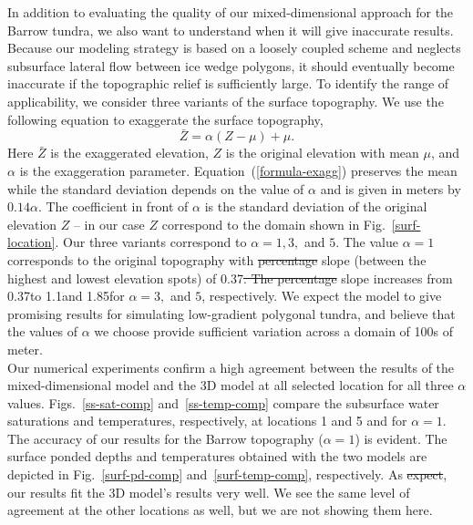 \documentclass[review,11pt]{elsarticle}
\providecommand{\DIFadd}[1]{{\protect\color{blue}\uwave{#1}}} %
\providecommand{\DIFdel}[1]{{\protect\color{red}\sout{#1}}}                      %
\providecommand{\DIFaddbegin}{} %
\providecommand{\DIFaddend}{} %
\providecommand{\DIFdelbegin}{} %
\providecommand{\DIFdelend}{} %
\begin{document}
In addition to evaluating the quality of our mixed-dimensional approach for the Barrow tundra, we also want to understand when it will give inaccurate results. Because our modeling strategy is based on a loosely coupled scheme and neglects subsurface lateral flow between ice wedge polygons, it should eventually become inaccurate if the topographic relief is sufficiently large. To identify the range of applicability, we consider three variants of the surface topography.  We use the following equation to exaggerate the surface topography,
\begin{equation}\label{formula-exagg}
\bar{Z} =  \alpha (Z - \mu) + \mu.
\end{equation}
Here $\bar{Z}$ is the exaggerated elevation, $Z$ is the original elevation with mean $\mu$, and $\alpha$ is the exaggeration parameter. Equation~(\ref{formula-exagg})  preserves the mean while the standard deviation depends on the value of $\alpha$ and is given in meters by $0.14 \alpha$. The coefficient in front of $\alpha$ is the standard deviation of the original elevation $Z$ -- in our case $Z$ correspond to the domain shown in Fig.~\ref{surf-location}. Our three variants correspond to $\alpha=1,3,$ and $5$. The value $\alpha=1$ corresponds to the original topography with \DIFdelbegin \DIFdel{percentage }\DIFdelend slope (between the highest and lowest elevation spots) of 0.37\DIFdelbegin \DIFdel{. The percentage }\DIFdelend \DIFaddbegin \DIFadd{\%. The }\DIFaddend slope increases from 0.37\DIFaddbegin \DIFadd{\% }\DIFaddend to 1.1\DIFaddbegin \DIFadd{\% }\DIFaddend and 1.85\DIFaddbegin \DIFadd{\% }\DIFaddend for $\alpha =3,$ and $5$, respectively. We expect the model to give promising results for simulating low-gradient polygonal tundra, and believe that the values of $\alpha$ we choose provide sufficient variation across a domain of 100s of meter.  \\
Our numerical experiments confirm a high agreement between the results of the mixed-dimensional model and the 3D model at all selected location for all three $\alpha$ values. Figs.~\ref{ss-sat-comp} and~\ref{ss-temp-comp} compare the subsurface water saturations and temperatures, respectively, at locations 1 and 5 and for $\alpha=1$. The accuracy of our results for the Barrow topography ($\alpha=1$) is evident. The surface ponded depths and temperatures obtained with the two models are depicted in Fig.~\ref{surf-pd-comp} and~\ref{surf-temp-comp}, respectively. As \DIFdelbegin \DIFdel{expect}\DIFdelend \DIFaddbegin \DIFadd{expected}\DIFaddend , our results fit the 3D model's results very well. We see the same level of agreement at the other locations as well, but we are not showing them here.
\end{document}
